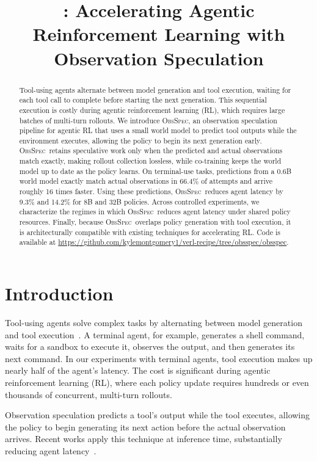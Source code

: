 \documentclass{article} %
\title{\method: Accelerating Agentic Reinforcement Learning with Observation Speculation}
\author{%
\makebox[\dimexpr\textwidth-2\tabcolsep\relax][c]{\begin{tabular}[t]{@{}c@{}}
Kyle Montgomery$^{1,2}$\thanks{Work done during an internship at ByteDance Seed.}
, Wang Zhang$^{2}$, Chenguang Wang$^{1}$\thanks{Corresponding author.} \\
\normalfont $^{1}$UC Santa Cruz, $^{2}$ByteDance Inc. \\
\normalfont \texttt{\{kylemontgomery,chenguangwang\}@ucsc.edu}
\end{tabular}}%
}
\newcommand{\method}{\textsc{ObsSpec}}
\begin{document}
\maketitle
\lhead{}
\renewcommand{\headrulewidth}{0pt}

\begin{abstract}
Tool-using agents alternate between model generation and tool execution, waiting for each tool call to complete before starting the next generation. This sequential execution is costly during agentic reinforcement learning (RL), which requires large batches of multi-turn rollouts. We introduce \method, an observation speculation pipeline for agentic RL that uses a small world model to predict tool outputs while the environment executes, allowing the policy to begin its next generation early. \method\ retains speculative work only when the predicted and actual observations match exactly, making rollout collection lossless, while co-training keeps the world model up to date as the policy learns. On terminal-use tasks, predictions from a 0.6B world model exactly match actual observations in 66.4\% of attempts and arrive roughly 16 times faster. Using these predictions, \method\ reduces agent latency by 9.3\% and 14.2\% for 8B and 32B policies. Across controlled experiments, we characterize the regimes in which \method\ reduces agent latency under shared policy resources. Finally, because \method\ overlaps policy generation with tool execution, it is architecturally compatible with existing techniques for accelerating RL. Code is available at \url{https://github.com/kylemontgomery1/verl-recipe/tree/obsspec/obsspec}.
\end{abstract}

\section{Introduction}
Tool-using agents solve complex tasks by alternating between model generation and tool execution~\citep{yao2022react,schick2023toolformer,qin2024toolllm}. A terminal agent, for example, generates a shell command, waits for a sandbox to execute it, observes the output, and then generates its next command. In our experiments with terminal agents, tool execution makes up nearly half of the agent's latency. The cost is significant during agentic reinforcement learning (RL), where each policy update requires hundreds or even thousands of concurrent, multi-turn rollouts.

Observation speculation predicts a tool's output while the tool executes, allowing the policy to begin generating its next action before the actual observation arrives. Recent works apply this technique at inference time, substantially reducing agent latency~\citep{ye2025speculative,cao2026auton,saberi2026spechop,li2026speculate,chen2026aospec}.
\end{document}
